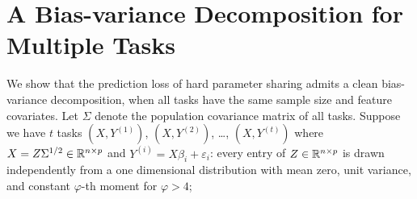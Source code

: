 \section{A Bias-variance Decomposition for Multiple Tasks}\label{sec_same}

We show that the prediction loss of hard parameter sharing admits a clean bias-variance decomposition, when all tasks have the same sample size and feature covariates.
Let $\Sigma$ denote the population covariance matrix of all tasks.
Suppose we have $t$ tasks $(X, Y^{(1)})$, $(X, Y^{(2)})$, \dots, $(X, Y^{(t)})$ where $X = Z \Sigma^{1/2} \in\mathbb{R}^{n\times p}$ and $Y^{(i)} = X \beta_i + \varepsilon_i$:
every entry of $Z \in \mathbb{R}^{n \times p}$ is drawn independently from a one dimensional distribution with mean zero, unit variance, and constant $\varphi$-th moment for $\varphi > 4$;
